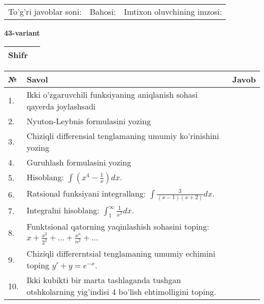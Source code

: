 \documentclass{article}
\begin{document}
  \vspace{1cm}
  
  \begin{tabular}{lll}
  To'g'ri javoblar soni: \underline{\hspace{1.5cm}} & 
  Bahosi: \underline{\hspace{1.5cm}} & 
  Imtixon oluvchining imzosi: \underline{\hspace{2cm}} \\
  \end{tabular}
  
  \egroup
  
  \newpage
  
  
  \textbf{43-variant}\\
  
  \bgroup
  \def\arraystretch{1.6} %
  
  \begin{tabular}{|m{5.7cm}|m{9.5cm}|}
  \hline
  Shifr & \\
  \hline
  \end{tabular}
  
  \vspace{1cm}
  
  \begin{tabular}{|m{0.7cm}|m{10cm}|m{4cm}|}
  \hline
  № & Savol & Javob \\
  \hline
  1. & Ikki o'zgaruvchili funksiyaning aniqlanish sohasi qayerda joylashsadi &  \\
  \hline
  2. & Nyuton-Leybnis formulasini yozing &  \\
  \hline
  3. & Chiziqli differensial tenglamaning umumiy ko'rinishini yozing &  \\
  \hline
  4. & Guruhlash formulasini yozing &  \\
  \hline
  5. & Hisoblang: \(\int \left( x^{4} - \frac{1}{x} \right)dx\). &  \\
  \hline
  6. & Ratsional funksiyani integrallang: \(\int {\frac{3}{(x - 1)(x + 2)}dx}\). &  \\
  \hline
  7. & Integralni hisoblang: \(\int_{1}^{\infty}{\frac{1}{x^{2}}dx}\). &  \\
  \hline
  8. & Funktsional qatorning yaqinlashish sohasini toping: \(x + \frac{x^{2}}{2^{2}} + ... + \frac{x^{n}}{n^{2}} + ...\) &  \\
  \hline
  9. & Chiziqli differerntsial tenglamaning umumiy echimini toping \(y' + y = e^{- x}\). &  \\
  \hline
  10. & Ikki kubikti bir marta tashlaganda tushgan otshkolarning yig'indisi 4 bo'lish ehtimolligini toping. &  \\
  \hline
  \end{tabular}
  
\end{document}
